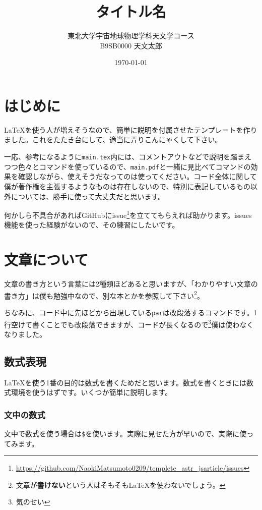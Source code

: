 \documentclass[a4paper,papersize,uplatex,dvipdfmx,10pt]{jsarticle}
\title{タイトル名}
\author{東北大学宇宙地球物理学科天文学コース\\B9SB0000\,\,天文太郎}
\date{\today}
\newcommand{\bs}{\symbol{92}} %
\begin{document}
\maketitle
\nocite{*}

\section{はじめに} %
\LaTeX を使う人が増えそうなので、簡単に説明を付属させたテンプレートを作りました。これをたたき台にして、適当に弄りこんにゃくして下さい。\par
一応、参考になるように\texttt{main.tex}内には、コメントアウトなどで説明を踏まえつつ色々とコマンドを使っているので、\texttt{main.pdf}と一緒に見比べてコマンドの効果を確認しながら、使えそうだなってのは使ってください。コード全体に関して僕が著作権を主張するようなものは存在しないので、特別に表記しているもの以外については、勝手に使って大丈夫だと思います。\par
何かしら不具合があればGitHubにissue\footnote{\url{https://github.com/NaokiMatsumoto0209/templete_astr_jsarticle/issues}}を立ててもらえれば助かります。issues機能を使った経験がないので、その練習にしたいです。

\section{文章について} %
文章の書き方という言葉には2種類ほどあると思いますが、「わかりやすい文章の書き方」は僕も勉強中なので、別な本とかを参照して下さい\footnote{文章が\textbf{書けない}という人はそもそも\LaTeX を使わないでしょう。}。\par
ちなみに、コード中に先ほどから出現している\texttt{\bs par}は改段落するコマンドです。1行空けて書くことでも改段落できますが、コードが長くなるので\footnote{気のせい}僕は使わなくなりました。\par

\subsection{数式表現} %
\LaTeX を使う1番の目的は数式を書くためだと思います。数式を書くときには数式環境を使うはずです。いくつか簡単に説明します。

\subsubsection{文中の数式} %
文中で数式を使う場合は\texttt{\$}を使います。実際に見せた方が早いので、実際に使ってみます。
\end{document}
